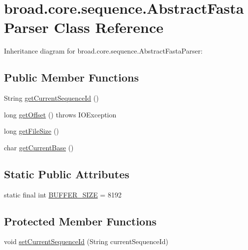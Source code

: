 \hypertarget{classbroad_1_1core_1_1sequence_1_1_abstract_fasta_parser}{\section{broad.\+core.\+sequence.\+Abstract\+Fasta\+Parser Class Reference}
\label{classbroad_1_1core_1_1sequence_1_1_abstract_fasta_parser}
}


Inheritance diagram for broad.\+core.\+sequence.\+Abstract\+Fasta\+Parser\+:
\subsection*{Public Member Functions}
\begin{DoxyCompactItemize}
\item 
String \hyperlink{classbroad_1_1core_1_1sequence_1_1_abstract_fasta_parser_af8f2a134ede096d51ded5e3f2b9fc4fd}{get\+Current\+Sequence\+Id} ()
\item 
long \hyperlink{classbroad_1_1core_1_1sequence_1_1_abstract_fasta_parser_a7abf04fe7636662479e5f1d52e9fd250}{get\+Offset} ()  throws I\+O\+Exception 
\item 
long \hyperlink{classbroad_1_1core_1_1sequence_1_1_abstract_fasta_parser_a91fd66568021c7d79e2f04e8778f35ce}{get\+File\+Size} ()
\item 
char \hyperlink{classbroad_1_1core_1_1sequence_1_1_abstract_fasta_parser_a7435a2e90f3fbd8a2215aed2278b2d8f}{get\+Current\+Base} ()
\end{DoxyCompactItemize}
\subsection*{Static Public Attributes}
\begin{DoxyCompactItemize}
\item 
static final int \hyperlink{classbroad_1_1core_1_1sequence_1_1_abstract_fasta_parser_ad21d17306f83599b02ff85d2781165d4}{B\+U\+F\+F\+E\+R\+\_\+\+S\+I\+Z\+E} = 8192
\end{DoxyCompactItemize}
\subsection*{Protected Member Functions}
\begin{DoxyCompactItemize}
\item 
void \hyperlink{classbroad_1_1core_1_1sequence_1_1_abstract_fasta_parser_ac75c101613d9c3832d862e2a04eee671}{set\+Current\+Sequence\+Id} (String current\+Sequence\+Id)
\end{DoxyCompactItemize}
